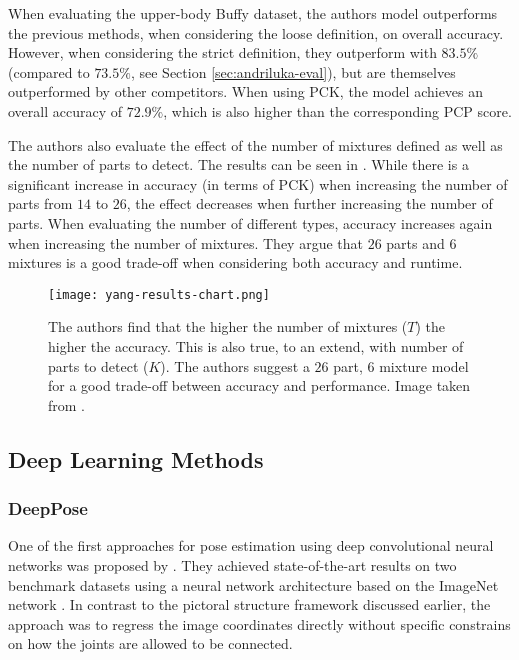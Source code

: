 When evaluating the upper-body Buffy dataset, the authors model outperforms the previous methods, when considering the loose definition, on overall accuracy.
However, when considering the strict definition, they outperform \cite{andriluka_pictorial_2009} with $83.5\%$ (compared to $73.5\%$, see Section \ref{sec:andriluka-eval}), but are themselves outperformed by other competitors.
When using PCK, the model achieves an overall accuracy of $72.9\%$, which is also higher than the corresponding PCP score.

The authors also evaluate the effect of the number of mixtures defined as well as the number of parts to detect.
The results can be seen in .
While there is a significant increase in accuracy (in terms of PCK) when increasing the number of parts from $14$ to $26$, the effect decreases when further increasing the number of parts.
When evaluating the number of different types, accuracy increases again when increasing the number of mixtures.
They argue that $26$ parts and $6$ mixtures is a good trade-off when considering both accuracy and runtime.  

\begin{figure}[htb!]
    \centering
    \texttt{[image: yang-results-chart.png]}
    \caption{The authors find that the higher the number of mixtures ($T$) the higher the accuracy. This is also true, to an extend, with number of parts to detect ($K$). The authors suggest a $26$ part, $6$ mixture model for a good trade-off between accuracy and performance. Image taken from \cite{yang_articulated_2011}.}
    \label{fig:yang-results-chart}
\end{figure}

\subsection{Deep Learning Methods}

\subsubsection{DeepPose}
\label{sec:deeppose}

One of the first approaches for pose estimation using deep convolutional neural networks was proposed by \cite{toshev_deeppose:_2014}.
They achieved state-of-the-art results on two benchmark datasets using a neural network architecture based on the ImageNet network \cite{krizhevsky_imagenet_2012}.
In contrast to the pictoral structure framework discussed earlier, the approach was to regress the image coordinates directly without specific constrains on how the joints are allowed to be connected.

